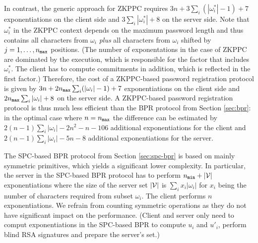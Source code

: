 In contrast, the generic approach for \ac{ZKPPC} requires $3n+3\sum_i (|\omega^\ast_i|-1)+7$ exponentiations on the client side and $3\sum_i |\omega^\ast_i|+8$ on the server side.
Note that $\omega^\ast_i$ in the \ac{ZKPPC} context depends on the maximum password length and thus contains all characters from $\omega_i$ \emph{plus} all characters from $\omega_i$ shifted by $j = 1,\ldots, {n_\mathtt{max}}$ positions.
(The number of exponentations in the case of \ac{ZKPPC} are dominated by the \PoM execution, which is responsible for the factor that includes $\omega^\ast_i$.
The client has to compute commitments in addition, which is reflected in the first factor.)
Therefore, the cost of a \ac{ZKPPC}-based password registration protocol is given by $3n+2{n_\mathtt{max}}\sum_i (|\omega_i|-1)+7$ exponentiations on the client side and $2{n_\mathtt{max}}\sum_i |\omega_i|+8$ on the server side. 
A \ac{ZKPPC}-based password registration protocol is thus much less efficient than the \ac{BPR} protocol from Section \ref{sec:bpr}: in the optimal case where $n={n_\mathtt{max}}$ the difference can be estimated by  $2(n-1)\sum_i|\omega_i| - 2n^2 - n - 106$ additional exponentiations for the client and $2(n-1)\sum_i|\omega_i| - 5n - 8$ additional exponentiations for the server.

The \ac{SPC}-based \ac{BPR} protocol from Section \ref{sec:spc-bpr} is based on mainly symmetric primitives, which yields a significant lower complexity.
In particular, the server in the \ac{SPC}-based \ac{BPR} protocol has to perform ${n_\mathtt{min}}+|\mathcal{V}|$ exponentiations where the size of the server set $|\mathcal{V}|$ is $\sum_i x_i|\omega_i|$ for $x_i$ being the number of characters required from subset $\omega_i$.
The client performs $n$ exponentiations.
We refrain from counting symmetric operations as they do not have significant impact on the performance.
(Client and server only need to comput exponentiations in the \ac{SPC}-based \ac{BPR} to compute $u_i$ and $u'_i$, \ie perform blind \ac{RSA} signatures and prepare the server's set.)

